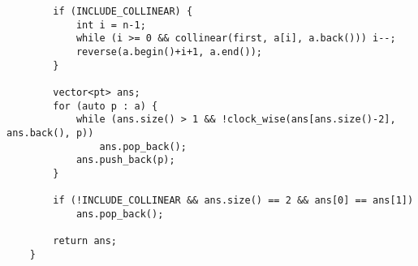 \begin{verbatim}
        if (INCLUDE_COLLINEAR) {
            int i = n-1;
            while (i >= 0 && collinear(first, a[i], a.back())) i--;
            reverse(a.begin()+i+1, a.end());
        }
    
        vector<pt> ans;
        for (auto p : a) {
            while (ans.size() > 1 && !clock_wise(ans[ans.size()-2], ans.back(), p))
                ans.pop_back();
            ans.push_back(p);
        }
    
        if (!INCLUDE_COLLINEAR && ans.size() == 2 && ans[0] == ans[1])
            ans.pop_back();
    
        return ans;
    }
    
    
\end{verbatim}

